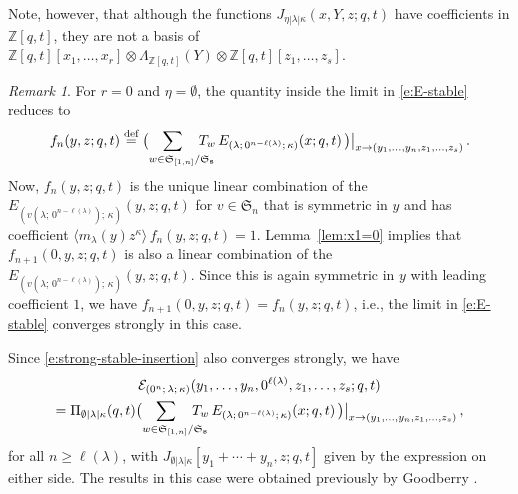 \documentclass[12pt]{amsart}
\theoremstyle{definition}
\theoremstyle{remark}
\newtheorem{remark}[thm]{Remark}
\newcommand{\ZZ}{{\mathbb Z}}
\newcommand{\sS}{{\mathbf s}}
\newcommand{\Sfrak}{{\mathfrak S}}
\newcommand{\Ecal}{{\mathcal E}}
\newcommand{\defeq}{\mathrel{\overset{\text{{\rm def}}}{=}}}
\newcommand{\Jns}{J}           %
\begin{document}
Note, however, that although the functions $\Jns _{\eta |\lambda
|\kappa }(x,Y,z;q,t)$ have coefficients in $\ZZ [q,t]$, they are not a
basis of $\ZZ [q,t] [x_{1},\ldots,x_{r}] \otimes \Lambda _{\ZZ
[q,t]}(Y)\otimes \ZZ [q,t] [z_{1},\ldots,z_{s}]$.

\begin{remark}\label{rem:Goodberry}
For $r=0$ and $\eta =\emptyset $, the quantity inside the limit in
\eqref{e:E-stable} reduces to
\begin{equation}\label{e:E-strong-stable}
f_{n}(y,z;q,t) \defeq \bigl( \sum _{w \in \Sfrak _{[1,n]}/ \Sfrak
_{\sS } \hspace{-3ex}} T_{w}\, E _{(\lambda ;\, 0^{n-\ell (\lambda
)};\, \kappa )}(x;q,t)\, \bigr) \bigr|_{x\rightarrow
(y_{1},\ldots,y_{n}, z_{1},\ldots,z_{s})}\, .
\end{equation}
Now, $f_{n}(y,z;q,t)$ is the unique linear combination of the
$E_{(v(\lambda ;\, 0^{n-\ell (\lambda )});\, \kappa )}(y,z;q,t)$ for
$v\in \Sfrak _{n}$ that is symmetric in $y$ and has coefficient
$\langle m_{\lambda }(y)z^{\kappa } \rangle\, f_{n}(y,z;q,t) = 1$.
Lemma~\ref{lem:x1=0} implies that $f_{n+1}(0,y,z;q,t)$ is also a
linear combination of the $E_{(v(\lambda ;\, 0^{n-\ell (\lambda )});\,
\kappa )}(y,z;q,t)$.  Since this is again symmetric in $y$ with
leading coefficient $1$, we have $f_{n+1}(0,y,z ;q,t) = f_{n}(y,z
;q,t)$, i.e., the limit in \eqref{e:E-stable} converges strongly in
this case.

Since \eqref{e:strong-stable-insertion} also converges strongly, we
have
\begin{multline}\label{e:Goodberry-identity}
\Ecal _{(0^{n};\, \lambda ;\, \kappa )}(y_{1},\ldots,y_{n},0^{\ell
(\lambda )},z_{1},\ldots,z_{s}; q,t)\\
 = \Pi _{\emptyset |\lambda |\kappa }(q,t) \bigl( \sum _{w \in \Sfrak
_{[1,n]}/ \Sfrak _{\sS } \hspace{-3ex}} T_{w}\, E _{(\lambda ;\,
0^{n-\ell (\lambda )};\, \kappa )}(x;q,t)\, \bigr)
\bigr|_{x\rightarrow (y_{1},\ldots,y_{n}, z_{1},\ldots,z_{s})}\, ,
\end{multline}
for all $n\geq \ell (\lambda )$, with $\Jns _{\emptyset |\lambda
|\kappa }[y_{1}+\cdots +y_{n},z;q,t]$ given by the expression on
either side.  The results in this case were obtained previously by
Goodberry \cite{Goodberry22, Goodberry24}.
\end{remark}
\end{document}
